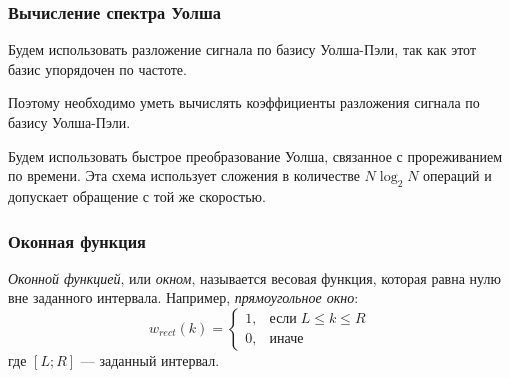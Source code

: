 \documentclass[notes=only]{beamer}
\begin{document}
  
\begin{frame}\frametitle{Вычисление спектра Уолша}
Будем использовать разложение сигнала по базису Уолша-Пэли, так как
этот базис упорядочен по частоте.

Поэтому необходимо уметь вычислять коэффициенты разложения сигнала по
базису Уолша-Пэли.

Будем использовать быстрое преобразование Уолша, связанное с прореживанием
по времени. Эта схема использует сложения в количестве 
$N\log_2 N$ операций
и допускает обращение с той же скоростью.

\end{frame}
    
    
    
\begin{frame}\frametitle{Оконная функция}
\emph{Оконной функцией}, или \emph{окном}, называется весовая функция, которая равна нулю вне заданного
интервала. Например, \emph{прямоугольное окно}:
$$
w_{rect}(k) = 
\left\{ \begin{array}{ll}
  1, & \textrm{если} \; L \leq k \leq R  \\
  0, & \textrm{иначе}
\end{array} \right.
$$
где $[L;R]$ --- заданный интервал.

\end{frame}
    
\end{document}
